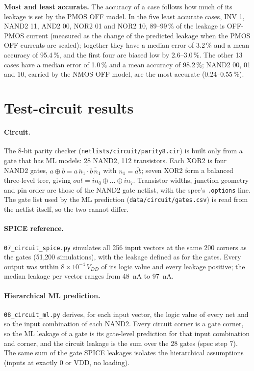 \documentclass[11pt,a4paper]{article}
\begin{document}
\textbf{Most and least accurate.} The accuracy of a case follows how much of its leakage is set by the
PMOS OFF model. In the five least accurate cases, INV 1, NAND2 11, AND2 00, NOR2 01 and NOR2 10, 89--99\,\%
of the leakage is OFF-PMOS current (measured as the change of the predicted leakage when the PMOS OFF
currents are scaled); together they have a median error of 3.2\,\% and a mean accuracy of 95.4\,\%,
and the first four are biased low by 2.6--3.0\,\%. The other 13 cases have a median error of 1.0\,\% and
a mean accuracy of 98.2\,\%; NAND2 00, 01 and 10, carried by the NMOS OFF model, are the most accurate
(0.24--0.55\,\%).

\section{Test-circuit results}\label{sec:circuit}
\paragraph{Circuit.} The 8-bit parity checker (\texttt{netlists/circuit/parity8.cir}) is built only
from a gate that has ML models: 28 NAND2, 112 transistors. Each XOR2 is four NAND2 gates,
$a \oplus b = \overline{\overline{a\,n_1}\cdot\overline{b\,n_1}}$ with $n_1 = \overline{ab}$; seven XOR2
form a balanced three-level tree, giving $out = in_0 \oplus \dots \oplus in_7$. Transistor widths,
junction geometry and pin order are those of the NAND2 gate netlist, with the spec's \texttt{.options}
line. The gate list used by the ML prediction (\texttt{data/circuit/gates.csv}) is read from the netlist
itself, so the two cannot differ.

\paragraph{SPICE reference.} \texttt{07\_circuit\_spice.py} simulates all 256 input vectors at the same
200 corners as the gates (51{,}200 simulations), with the leakage defined as for the gates. Every output
was within $8\times10^{-4}\,V_{DD}$ of its logic value and every leakage positive; the median leakage per
vector ranges from \SI{48}{nA} to \SI{97}{nA}.

\paragraph{Hierarchical ML prediction.} \texttt{08\_circuit\_ml.py} derives, for each input vector, the
logic value of every net and so the input combination of each NAND2. Every circuit corner is a gate
corner, so the ML leakage of a gate is its gate-level prediction for that input combination and corner,
and the circuit leakage is the sum over the 28 gates (spec step 7). The same sum of the gate SPICE
leakages isolates the hierarchical assumptions (inputs at exactly 0 or VDD, no loading).
\end{document}
